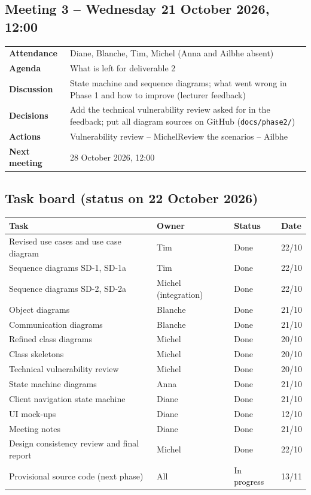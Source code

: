 \documentclass[11pt,a4paper]{article}
\begin{document}
\subsection{Meeting 3 -- Wednesday 21 October 2026, 12:00}
\begin{tabularx}{\textwidth}{>{\bfseries}p{3cm} L}
Attendance & Diane, Blanche, Tim, Michel (Anna and Ailbhe absent)\\
Agenda & What is left for deliverable 2\\
Discussion & State machine and sequence diagrams; what went wrong in Phase 1 and how to improve (lecturer feedback)\\
Decisions & Add the technical vulnerability review asked for in the feedback; put all diagram sources on GitHub (\texttt{docs/phase2/})\\
Actions & Vulnerability review -- Michel\newline Review the scenarios -- Ailbhe\\
Next meeting & 28 October 2026, 12:00\\
\end{tabularx}

\subsection{Task board (status on 22 October 2026)}
\small
\begin{tabularx}{\textwidth}{L l l l}
\toprule
\textbf{Task} & \textbf{Owner} & \textbf{Status} & \textbf{Date}\\ \midrule
Revised use cases and use case diagram & Tim & Done & 22/10\\
Sequence diagrams SD-1, SD-1a & Tim & Done & 22/10\\
Sequence diagrams SD-2, SD-2a & Michel (integration) & Done & 22/10\\
Object diagrams & Blanche & Done & 21/10\\
Communication diagrams & Blanche & Done & 21/10\\
Refined class diagrams & Michel & Done & 20/10\\
Class skeletons & Michel & Done & 20/10\\
Technical vulnerability review & Michel & Done & 20/10\\
State machine diagrams & Anna & Done & 21/10\\
Client navigation state machine & Diane & Done & 21/10\\
UI mock-ups & Diane & Done & 12/10\\
Meeting notes & Diane & Done & 21/10\\
Design consistency review and final report & Michel & Done & 22/10\\
Provisional source code (next phase) & All & In progress & 13/11\\
\bottomrule
\end{tabularx}
\normalsize
\end{document}
